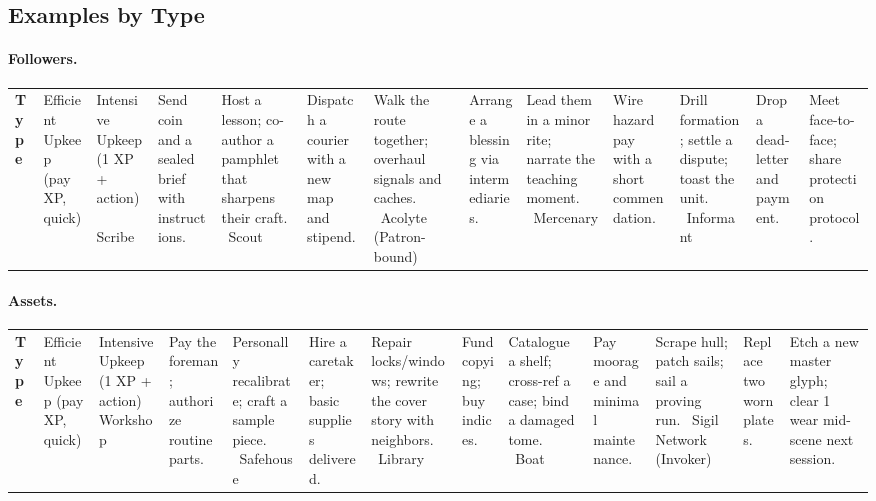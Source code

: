 \subsection{Examples by Type}\label{subsec:upkeep-examples}
\paragraph{Followers.}
\begin{tabularx}{\linewidth}{>{\bfseries}l X X}
\toprule
Type & Efficient Upkeep (pay XP, quick) & Intensive Upkeep (1 XP + action) \
\midrule
Scribe & Send coin and a sealed brief with instructions. & Host a lesson; co-author a pamphlet that sharpens their craft. \
Scout & Dispatch a courier with a new map and stipend. & Walk the route together; overhaul signals and caches. \
Acolyte (Patron-bound) & Arrange a blessing via intermediaries. & Lead them in a minor rite; narrate the teaching moment. \
Mercenary & Wire hazard pay with a short commendation. & Drill formation; settle a dispute; toast the unit. \
Informant & Drop a dead-letter and payment. & Meet face-to-face; share protection protocol. \
\bottomrule
\end{tabularx}

\paragraph{Assets.}
\begin{tabularx}{\linewidth}{>{\bfseries}l X X}
\toprule
Type & Efficient Upkeep (pay XP, quick) & Intensive Upkeep (1 XP + action) \
\midrule
Workshop & Pay the foreman; authorize routine parts. & Personally recalibrate; craft a sample piece. \
Safehouse & Hire a caretaker; basic supplies delivered. & Repair locks/windows; rewrite the cover story with neighbors. \
Library & Fund copying; buy indices. & Catalogue a shelf; cross-ref a case; bind a damaged tome. \
Boat & Pay moorage and minimal maintenance. & Scrape hull; patch sails; sail a proving run. \
Sigil Network (Invoker) & Replace two worn plates. & Etch a new master glyph; clear 1 wear mid-scene next session. \
\bottomrule
\end{tabularx}

